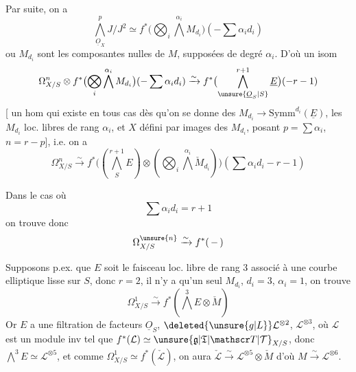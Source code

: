 Par suite, on a
\[
\bigwedge_{\underline O_X}^p J/J^2\simeq f^*\bigl(\bigotimes_i\bigwedge^{\alpha_i} M_{d_i}\bigr)(-\sum\alpha_i d_i)
\]
ou $M_{d_i}$ sont les composantes  nulles de $M$, supposées
de degré $\alpha_i$. D'où un isom
\[
\Omega^n_{X/S}\otimes f^*\bigl(\bigotimes_i\bigwedge^{\alpha_i}M_{d_i}\bigr)(-\sum\alpha_i d_i)
\xrightarrow{\sim}f^*\bigl(\bigwedge_{\unsure{\underline O_S|S}}^{r+1}\underline E\bigr)(-r-1)
\]
[ un hom qui existe en tous cas dès
qu'on se donne des $M_{d_i}\longrightarrow\mathrm{Symm}^{d_i}(\underline E)$, les $M_{d_i}$ loc.
libres de rang $\alpha_i$, et $X$ défini par  images
des $M_{d_i}$, posant $p=\sum\alpha_i$, $n=r-p$], i.e. on a
\[
\Omega^n_{X/S}\xrightarrow{\sim}f^*\bigl((\bigwedge_S^{r+1}E)\otimes(\bigotimes_i\bigwedge^{\alpha_i}\check M_{d_i})\bigr)(\sum\alpha_i d_i-r-1)
\]

Dans le cas où
\[
\sum\alpha_i d_i=r+1
\]
on trouve donc
\[
\Omega^{\unsure{n}}_{X/S}\xrightarrow{\sim}f^*(\,-\,)
\]

Supposons p.ex. que $E$ soit le faisceau loc. libre de
rang $3$ associé à une courbe elliptique lisse
sur $S$, donc $r=2$, il n'y a qu'un seul $M_{d_i}$, $d_i=3$,
$\alpha_i=1$, on trouve
\[
\Omega^1_{X/S}\xrightarrow{\sim} f^*(\bigwedge^3 E\otimes\check M)
\]
Or $E$ a une filtration de facteurs $\underline O_S$, $\deleted{\unsure{g|L}}\mathcal L^{\otimes2}$, $\mathcal L^{\otimes3}$,
où $\mathcal L$ est un module inv tel que $f^*(\mathcal L)\simeq\unsure{\mathfrak g|\mathfrak T|\mathscr T|\mathcal T}_{X/S}$, donc
$\bigwedge^3 E\simeq\mathcal L^{\otimes5}$, et comme $\Omega^1_{X/S}\simeq f^*(\check{\mathcal L})$, on aura
$\check{\mathcal L}\xrightarrow{\sim}\mathcal L^{\otimes5}\otimes\check M$ d'où $M\xrightarrow{\sim}\mathcal L^{\otimes6}$.

